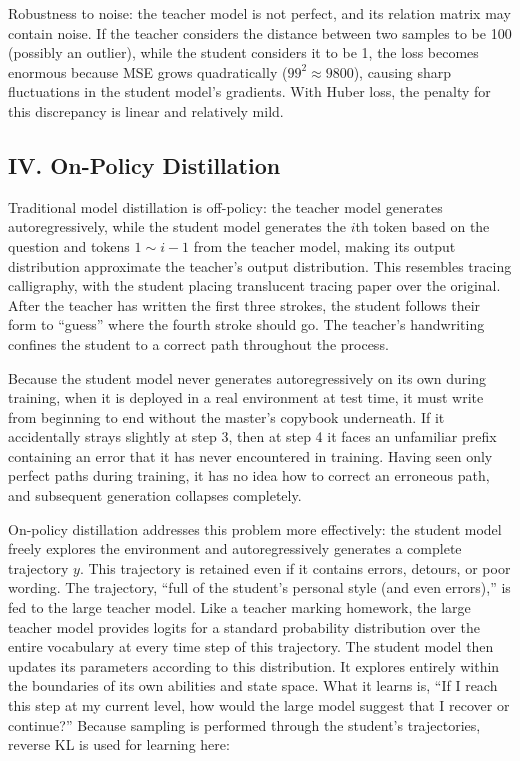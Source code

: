 Robustness to noise: the teacher model is not perfect, and its relation matrix may contain noise. If the teacher considers the distance between two samples to be 100 (possibly an outlier), while the student considers it to be 1, the loss becomes enormous because MSE grows quadratically (\(99^2 \approx 9800\)), causing sharp fluctuations in the student model's gradients. With Huber loss, the penalty for this discrepancy is linear and relatively mild.

\hypertarget{iv.-on-policy-distillation}{%
\subsection{IV. On-Policy Distillation}\label{iv.-on-policy-distillation}}

Traditional model distillation is off-policy: the teacher model generates autoregressively, while the student model generates the \(i\)th token based on the question and tokens \(1 \sim i-1\) from the teacher model, making its output distribution approximate the teacher's output distribution. This resembles tracing calligraphy, with the student placing translucent tracing paper over the original. After the teacher has written the first three strokes, the student follows their form to ``guess'' where the fourth stroke should go. The teacher's handwriting confines the student to a correct path throughout the process.

Because the student model never generates autoregressively on its own during training, when it is deployed in a real environment at test time, it must write from beginning to end without the master's copybook underneath. If it accidentally strays slightly at step 3, then at step 4 it faces an unfamiliar prefix containing an error that it has never encountered in training. Having seen only perfect paths during training, it has no idea how to correct an erroneous path, and subsequent generation collapses completely.

On-policy distillation addresses this problem more effectively: the student model freely explores the environment and autoregressively generates a complete trajectory \(y\). This trajectory is retained even if it contains errors, detours, or poor wording. The trajectory, ``full of the student's personal style (and even errors),'' is fed to the large teacher model. Like a teacher marking homework, the large teacher model provides logits for a standard probability distribution over the entire vocabulary at every time step of this trajectory. The student model then updates its parameters according to this distribution. It explores entirely within the boundaries of its own abilities and state space. What it learns is, ``If I reach this step at my current level, how would the large model suggest that I recover or continue?'' Because sampling is performed through the student's trajectories, reverse KL is used for learning here:

